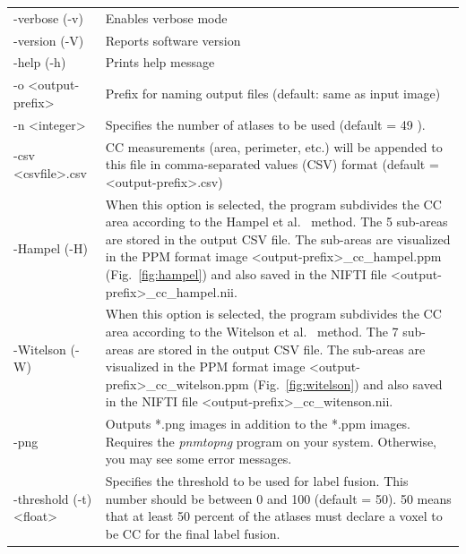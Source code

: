 \documentclass[11pt]{article}
\newcommand{\TG}{\textgreater}
\newcommand{\TL}{\textless}
\begin{document}

\begin{longtable}{p{}p{}}
-verbose (-v) & Enables verbose mode \\

-version (-V) &
	Reports software version \\

-help (-h) &
	Prints help message \\

-o \TL output-prefix\TG & 
	Prefix for naming output files (default: same as input image) \\

-n \TL integer\TG & Specifies the number of atlases to be used 
(default = 49 ).\\

-csv \TL csvfile\TG.csv & CC measurements (area, perimeter, etc.) will be 
appended to this file in comma-separated values (CSV) format 
(default = \TL output-prefix\TG.csv) \\

-Hampel (-H) & When this option is selected, the program subdivides the CC area
according to the Hampel et al.\ \citep{Hampel1998-fz} method. The 5 sub-areas are stored
in the output CSV file. The sub-areas are visualized in the PPM format image
\TL output-prefix\TG\_cc\_hampel.ppm
(Fig.\ \ref{fig:hampel}) and also saved in the NIFTI file
\TL output-prefix\TG\_cc\_hampel.nii.\\

-Witelson (-W) & When this option is selected, the program subdivides the CC area
according to the Witelson et al.\ \citep{Narayan2016-es} method. The 7 sub-areas are stored
in the output CSV file. The sub-areas are visualized in the PPM format image
\TL output-prefix\TG\_cc\_witelson.ppm
(Fig.\ \ref{fig:witelson}) and also saved in the NIFTI file
\TL output-prefix\TG\_cc\_witenson.nii.\\

-png & Outputs *.png images in addition to the *.ppm images. Requires
the {\em pnmtopng} program on your system. Otherwise, you may see some
error messages.\\

-threshold (-t) \TL float\TG &  Specifies the threshold to be used for label fusion.
This number should be between 0 and 100 (default = 50).  50 means that at least
50 percent of the atlases must declare a voxel to be CC for the final label fusion. \\


\end{longtable}
\end{document}
